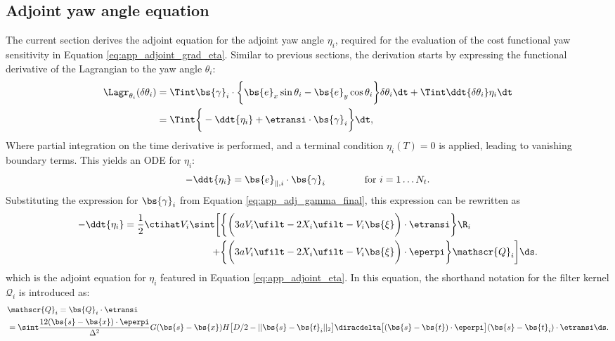 \subsection{Adjoint yaw angle equation}
The current section derives the adjoint equation for the adjoint yaw angle $\eta_i$, required for the evaluation of the cost functional yaw sensitivity in Equation \eqref{eq:app_adjoint_grad_eta}. Similar to previous sections, the derivation starts by expressing the functional derivative of the Lagrangian to the yaw angle $\theta_i$: 
\begin{align}
\Lagr_{\theta_i}(\delta \theta_i) &= 
\Tint \bs{\gamma}_i \cdot \bigg\{ \bs{e}_x \sin \theta_i - \bs{e}_y \cos \theta_i  \bigg\} \delta \theta_i \dt + \Tint \ddt{\delta \theta_i} \eta_i \dt \\ 
&= \Tint \bigg\{ -\ddt{\eta_i} + \etransi \cdot \bs{\gamma}_i   \bigg\} \dt,
\end{align}
Where partial integration on the time derivative is performed, and a terminal condition $\eta_i(T) = 0$ is applied, leading to vanishing boundary terms. This yields an ODE for $\eta_i$:
\begin{equation}\label{eq:app_adj_eta_basic}
- \ddt{\eta_i} = \bs{e}_{\parallel,i} \cdot \bs{\gamma}_i 
\qquad\qquad \text{for } i=1\dots N_t.
\end{equation}
Substituting the expression for $\bs{\gamma}_i$ from Equation \eqref{eq:app_adj_gamma_final}, this expression can be rewritten as 
\begin{align}
- \ddt{\eta_i} =  \frac{1}{2} \ctihat V_i \sint \bigg[ & \bigg\{ \bigg(3a V_i \ufilt  - 2 X_i \ufilt - V_i\bs{\xi} \bigg) \cdot \etransi   \bigg\} \R_i  \nonumber\\
+ & \bigg\{ \bigg(3aV_i \ufilt  -2 X_i \ufilt - V_i\bs{\xi} \bigg) \cdot \eperpi \bigg\} \mathscr{Q}_i \bigg] \ds. \label{eq:app_adj_eta_final} 
\end{align}
which is the adjoint equation for $\eta_i$ featured in Equation \eqref{eq:app_adjoint_eta}. In this equation, the shorthand notation for the filter kernel $\mathscr{Q}_i$ is introduced as:
{\small
\begin{align}
	& \mathscr{Q}_i = \bs{Q}_i \cdot \etransi \nonumber \\
	&= \sint \frac{12 (\bs{s} - \bs{x})\cdot \eperpi}{\Delta^2} G(\bs{s} - \bs{x})  H\big[D/2 - \vert\vert \bs{s} - \bs{t}_i \vert\vert_2 \big] \diracdelta\big[(\bs{s} - \bs{t})\cdot \eperpi \big]  (\bs{s} - \bs{t}_i) \cdot \etransi \ds.
\end{align}}

